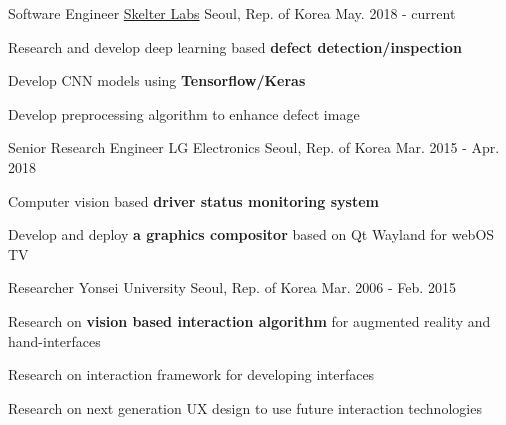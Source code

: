 


\begin{cventries}


  \cventry
    {Software Engineer} %
    {\href{https://www.skelterlabs.com/}{Skelter Labs}} %
    {Seoul, Rep. of Korea} %
    {May. 2018 - current} %
    {
      \begin{cvitems} %
        \item {Research and develop deep learning based \textbf{defect detection/inspection}}
        \item {Develop CNN models using \textbf{Tensorflow/Keras}}
        \item {Develop preprocessing algorithm to enhance defect image}
      \end{cvitems}
    }

  \cventry
    {Senior Research Engineer} %
    {LG Electronics} %
    {Seoul, Rep. of Korea} %
    {Mar. 2015 - Apr. 2018} %
    {
      \begin{cvitems} %
        \item {Computer vision based \textbf{driver status monitoring system}}
        \item {Develop and deploy \textbf{a graphics compositor} based on Qt Wayland for webOS TV}
      \end{cvitems}
    }


  \cventry
    {Researcher} %
    {Yonsei University} %
    {Seoul, Rep. of Korea} %
    {Mar. 2006 - Feb. 2015} %
    {
      \begin{cvitems} %
        \item {Research on \textbf{vision based interaction algorithm} for augmented reality and hand-interfaces}
        \item {Research on interaction framework for developing interfaces}
        \item {Research on next generation UX design to use future interaction technologies}
      \end{cvitems}
    }

\end{cventries}
